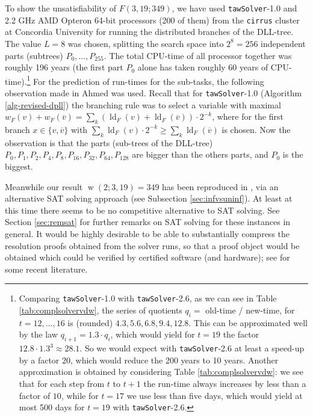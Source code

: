 \documentclass[final,3p,times]{elsarticle}
\theoremstyle{definition}
\newcommand{\set}[1]{\{#1\}}
\newcommand{\ol}{\overline}
\newcommand{\tawsolver}{\texttt{tawSolver}}
\newcommand{\otawsolver}{\tawsolver-1.0}
\newcommand{\ntawsolver}{\tawsolver-2.6}
\DeclareMathOperator{\vdw}{w}
\DeclareMathOperator{\ldeg}{ld} %
\begin{document}
To show the unsatisfiability of $F(3,19;349)$, we have used \otawsolver{} and 2.2 GHz AMD Opteron 64-bit processors (200 of them) from the {\tt cirrus} cluster at Concordia University for running the
distributed branches of the DLL-tree. The value $L=8$ was chosen, splitting the search space into $2^8=256$ independent parts (subtrees) $P_0, \dots, P_{255}$. The total CPU-time of all processor together was roughly 196 years (the first part $P_0$ alone has taken roughly 60 years of CPU-time).\footnote{Comparing \otawsolver{} with \ntawsolver, as we can see in Table \ref{tab:complsolvervdw}, the series of quotients $q_i = $ old-time / new-time, for $t = 12, \dots, 16$ is (rounded) $4.3,5.6,6.8,9.4,12.8$. This can be approximated well by the law $q_{i+1} = 1.3 \cdot q_i$, which would yield for $t=19$ the factor $12.8 \cdot 1.3^3 \approx 28.1$. So we would expect with \ntawsolver{} at least a speed-up by a factor $20$, which would reduce the 200 years to 10 years. Another approximation is obtained by considering Table \ref{tab:complsolvervdw}: we see that for each step from $t$ to $t+1$ the run-time always increases by less than a factor of $10$, while for $t=17$ we use less than five days, which would yield at most 500 days for $t=19$ with \ntawsolver.} For the prediction of run-times for the sub-tasks, the following observation made in Ahmed \cite{ahmed2010} was used. Recall that for \otawsolver{} (Algorithm \ref{alg-revised-dpll}) the branching rule was to select a variable with maximal $w_F(v) + w_F(\ol{v}) = \sum_k (\ldeg_F(v) + \ldeg_F(\ol{v})) \cdot 2^{-k}$, where for the first branch $x \in \set{v,\ol{v}}$ with $\sum_k \ldeg_F(v) \cdot 2^{-k} \geq \sum_k \ldeg_F(\ol{v})$ is chosen. Now the observation is that the parts (sub-trees of the DLL-tree) $P_0,P_1,P_2,P_4,P_8,P_{16},P_{32},P_{64},P_{128}$ are bigger than the others parts, and $P_0$ is the biggest.

Meanwhile our result $\vdw(2;3,19)=349$ has been reproduced in \cite{Kouril2012W34}, via an alternative SAT solving approach (see Subsection \ref{sec:infvsuninf}). At least at this time there seems to be no competitive alternative to SAT solving. See Section \ref{sec:remsat} for further remarks on SAT solving for these instances in general. It would be highly desirable to be able to substantially compress the resolution proofs obtained from the solver runs, so that a proof object would be obtained which could be verified by certified software (and hardware); see \cite{Cotton2010MinimizingResolution} for some recent literature.
\end{document}
